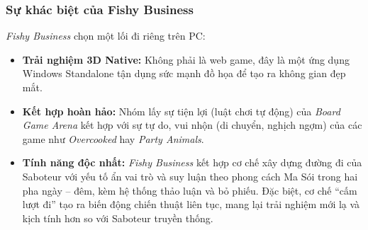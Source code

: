 \subsubsection{Sự khác biệt của Fishy Business}
\textit{Fishy Business} chọn một lối đi riêng trên PC:
\begin{itemize}
    \item \textbf{Trải nghiệm 3D Native:} Không phải là web game, đây là một ứng dụng Windows Standalone tận dụng sức mạnh đồ họa để tạo ra không gian đẹp mắt.
    \item \textbf{Kết hợp hoàn hảo:} Nhóm lấy sự tiện lợi (luật chơi tự động) của \textit{Board Game Arena} kết hợp với sự tự do, vui nhộn (di chuyển, nghịch ngợm) của các game như \textit{Overcooked} hay \textit{Party Animals}.
    \item \textbf{Tính năng độc nhất:} \textit{Fishy Business} kết hợp cơ chế xây dựng đường đi của Saboteur với yếu tố ẩn vai trò và suy luận theo phong cách Ma Sói trong hai pha ngày – đêm, kèm hệ thống thảo luận và bỏ phiếu. Đặc biệt, cơ chế “cấm lượt đi” tạo ra biến động chiến thuật liên tục, mang lại trải nghiệm mới lạ và kịch tính hơn so với Saboteur truyền thống.
\end{itemize}

\newpage